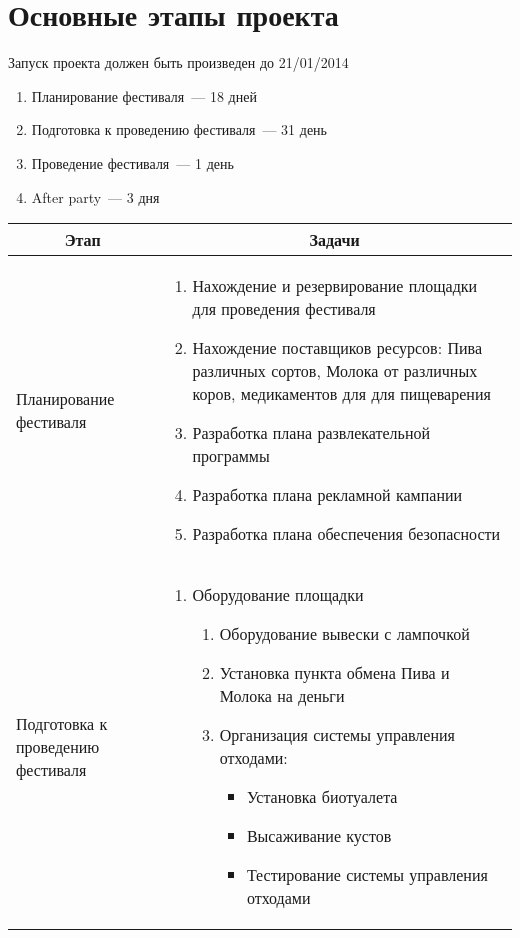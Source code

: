 \documentclass[a4paper,12pt]{article}
\begin{document}
\section{Основные этапы проекта}
Запуск проекта должен быть произведен до 21/01/2014
\begin{enumerate}
  \item{Планирование фестиваля~--- 18 дней}
  \item{Подготовка к проведению фестиваля~--- 31 день}
  \item{Проведение фестиваля~--- 1 день}
  \item{After party~--- 3 дня}
\end{enumerate}
\begin{center}
\begin{longtable}{|p{4cm}|p{11cm}|}
  \hline
  \multicolumn{1}{|c|}{\textbf{Этап}} & \multicolumn{1}{|c|}{\textbf{Задачи}}\\
  \hline
  \endhead
  Планирование фестиваля & 
  \begin{enumerate}
    \item Нахождение и резервирование площадки для проведения фестиваля
    \item Нахождение поставщиков ресурсов: Пива различных сортов, Молока от различных коров, медикаментов для для пищеварения 
    \item Разработка плана развлекательной программы 
    \item Разработка плана рекламной кампании
    \item Разработка плана обеспечения безопасности
  \end{enumerate} \\
  \hline
  Подготовка к проведению фестиваля & 
  \begin{enumerate}
    \item Оборудование площадки 
      \begin{enumerate}
        \item Оборудование вывески с лампочкой
        \item Установка пункта обмена Пива и Молока на деньги 
        \item Организация системы управления отходами:
          \begin{itemize}
            \item Установка биотуалета
            \item Высаживание кустов
            \item Тестирование системы управления отходами
          \end{itemize}

\end{enumerate}
\end{enumerate}
\end{longtable}
\end{center}
\end{document}
